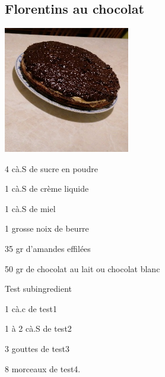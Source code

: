 \setcounter{step}{0}
\subsection{Florentins au chocolat}
\newcommand\porcie{4}

\begin{ingredient}

\includegraphics[height=5.5cm]{images/daim}
\def\portions{Document1}%


\begin{main}
	\item 4 cà.S de sucre en poudre
	\item 1 cà.S de crème liquide
	\item 1 cà.S de miel
	\item 1 grosse noix de beurre
	\item 35 gr d’amandes effilées
	\item 50 gr de chocolat au lait ou chocolat blanc
\end{main}
\begin{subingredient}{Test subingredient}
	\item 1 cà.c de test1
	\item 1 à 2 cà.S de test2
	\item 3 gouttes de test3
	\item 8 morceaux de test4.	
\end{subingredient}

\end{ingredient}
